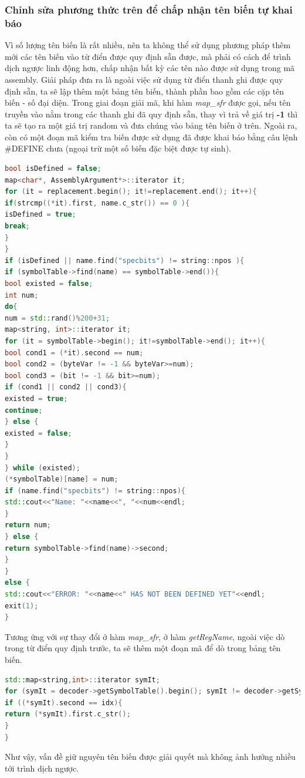 
\subsubsection{Chỉnh sửa phương thức trên để chấp nhận tên biến tự khai báo}
Vì số lượng tên biến là rất nhiều, nên ta không thể sử dụng phương pháp thêm mới các tên biến vào từ điển được quy định sẵn được, mà phải có cách để trình dịch ngược linh động hơn, chấp nhận bất kỳ các tên nào được sử dụng trong mã assembly. Giải pháp đưa ra là ngoài việc sử dụng từ điển thanh ghi được quy định sẵn, ta sẽ lập thêm một bảng tên biến, thành phần bao gồm các cặp tên biến - số đại diện. Trong giai đoạn giải mã, khi hàm \textit{map\_sfr} được gọi, nếu tên truyền vào nằm trong các thanh ghi đã quy định sẵn, thay vì trả về giá trị \textbf{-1} thì ta sẽ tạo ra một giá trị random và đưa chúng vào bảng tên biến ở trên. Ngoài ra, còn có một đoạn mã kiểm tra biến được sử dụng đã được khai báo bằng câu lệnh \#DEFINE chưa (ngoại trừ một số biến đặc biệt được tự sinh). \\
\begin{lstlisting}[caption={Phần mã mới được bổ sung trong hàm map\_sfr},label={list:listmapsfrnew},language=c++]
bool isDefined = false;
map<char*, AssemblyArgument*>::iterator it;
for (it = replacement.begin(); it!=replacement.end(); it++){
if(strcmp((*it).first, name.c_str()) == 0 ){
isDefined = true;
break;
}
}
if (isDefined || name.find("specbits") != string::npos ){
if (symbolTable->find(name) == symbolTable->end()){
bool existed = false;
int num;
do{
num = std::rand()%200+31;
map<string, int>::iterator it;
for (it = symbolTable->begin(); it!=symbolTable->end(); it++){
bool cond1 = (*it).second == num;
bool cond2 = (byteVar != -1 && byteVar>=num);
bool cond3 = (bit != -1 && bit>=num);
if (cond1 || cond2 || cond3){
existed = true;
continue;
} else {
existed = false;
}
}
} while (existed); 
(*symbolTable)[name] = num;
if (name.find("specbits") != string::npos){
std::cout<<"Name: "<<name<<", "<<num<<endl;
}
return num;
} else {
return symbolTable->find(name)->second;
}
}
else {
std::cout<<"ERROR: "<<name<<" HAS NOT BEEN DEFINED YET"<<endl;
exit(1);
}
\end{lstlisting}
Tương ứng với sự thay đổi ở hàm \textit{map\_sfr},  ở hàm \textit{getRegName}, ngoài việc dò trong từ điển quy định trước, ta sẽ thêm một đoạn mã để dò trong bảng tên biến. 
\begin{lstlisting}[caption={Phần mã mới được bổ sung trong hàm getRegName},label={list:listgetregnamenew},language=c++]
std::map<string,int>::iterator symIt;
for (symIt = decoder->getSymbolTable().begin(); symIt != decoder->getSymbolTable().end(); symIt++){
if ((*symIt).second == idx){
return (*symIt).first.c_str();
}
}
\end{lstlisting}
Như vậy, vấn đề giữ nguyên tên biến được giải quyết mà không ảnh hưởng nhiều tới trình dịch ngược.

